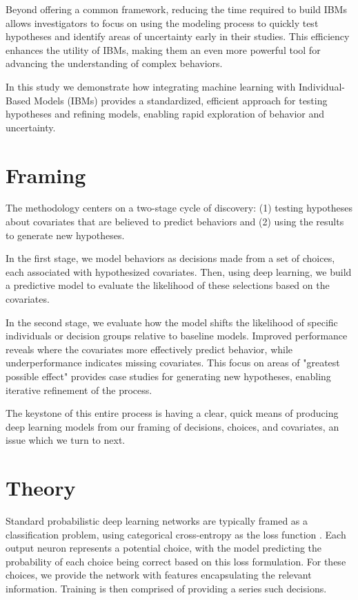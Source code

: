 \documentclass[11pt]{article}
\begin{document}
Beyond offering a common framework, reducing the time required to build IBMs allows investigators to focus on using the modeling process to quickly test hypotheses and identify areas of uncertainty early in their studies. This efficiency enhances the utility of IBMs, making them an even more powerful tool for advancing the understanding of complex behaviors.

In this study we demonstrate how integrating machine learning with Individual-Based Models (IBMs) provides a standardized, efficient approach for testing hypotheses and refining models, enabling rapid exploration of behavior and uncertainty.

\section*{Framing}

The methodology centers on a two-stage cycle of discovery: (1) testing hypotheses about covariates that are believed to predict behaviors and (2) using the results to generate new hypotheses.

In the first stage, we model behaviors as decisions made from a set of choices, each associated with hypothesized covariates. Then, using deep learning, we build a predictive model to evaluate the likelihood of these selections based on the covariates.

In the second stage, we evaluate how the model shifts the likelihood of specific individuals or decision groups relative to baseline models. Improved performance reveals where the covariates more effectively predict behavior, while underperformance indicates missing covariates. This focus on areas of "greatest possible effect" provides case studies for generating new hypotheses, enabling iterative refinement of the process.

The keystone of this entire process is having a clear, quick means of producing deep learning models from our framing of decisions, choices, and covariates, an issue which we turn to next. 

\section*{Theory}

Standard probabilistic deep learning networks are typically framed as a classification problem, using categorical cross-entropy as the loss function \citep{durr}. Each output neuron represents a potential choice, with the model predicting the probability of each choice being correct based on this loss formulation. For these choices, we provide the network with features encapsulating the relevant information. Training is then comprised of providing a series such decisions. 
\end{document}
